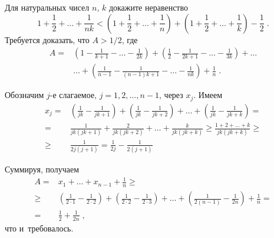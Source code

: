 \problem
Для натуральных чисел $n$, $k$ докажите неравенство
\[
    1 + \frac{1}{2} + \ldots + \frac{1}{n k}
<
    \left(
        1 + \frac{1}{2} + \ldots + \frac{1}{n}
    \right)
    +
    \left(
        1 + \frac{1}{2} + \dots + \frac{1}{k}
    \right)
    -
    \frac{1}{2}
\;.\]
\solution
Требуется доказать, что $A > 1 / 2$, где
\begin{align*}
    A
={}&
    \left(
        1 - \frac{1}{k + 1} - \ldots - \frac{1}{2 k}
    \right)
    +
    \left(
        \frac{1}{2} - \frac{1}{2 k + 1} - \ldots - \frac{1}{3 k}
    \right)
    +\ldots\\&{}\ldots+
    \left(
        \frac{1}{n - 1} - \frac{1}{(n - 1) k + 1} - \ldots - \frac{1}{n k}
    \right)
    +
    \frac{1}{n}
\;.\end{align*}
\par
Обозначим $j$-е слагаемое, $j = 1, 2, \ldots, n - 1$, через $x_j$.
Имеем
\begin{align*}
    x_j
={}&
    \left(
        \frac{1}{j k} - \frac{1}{j k + 1}
    \right)
    +
    \left(
        \frac{1}{j k} - \frac{1}{j k + 2}
    \right)
    + \ldots+
    \left(
        \frac{1}{j k} - \frac{1}{j k + k}
    \right)
=\\={}&
    \frac{1}{j k (j k + 1)}
    +
    \frac{2}{j k (j k + 2)}
    +\ldots+
    \frac{k}{j k (j k + k)}
\geq
    \frac{1 + 2 + \ldots + k}{j k (j k + k)}
\geq\\\geq{}&
    \frac{1}{2 j (j + 1)}
=
    \frac{1}{2 j} - \frac{1}{2 (j + 1)}
\end{align*}
\par
Суммируя, получаем 
\begin{align*}
    A
={}&
    x_1 + \ldots + x_{n-1} + \frac{1}{n}
\geq\\\geq{}&
    \left(
        \frac{1}{2 \cdot 1} - \frac{1}{2 \cdot 2}
    \right)
    +
    \left(
        \frac{1}{2 \cdot 2} - \frac{1}{2 \cdot 3}
    \right)
    + \ldots +
    \left(
        \frac{1}{2 (n - 1)} - \frac{1}{2 n}
    \right)
    +
    \frac{1}{n}
=\\={}&
    \frac{1}{2} + \frac{1}{2n}
\;,\end{align*}
что и~требовалось.
\endproblem
